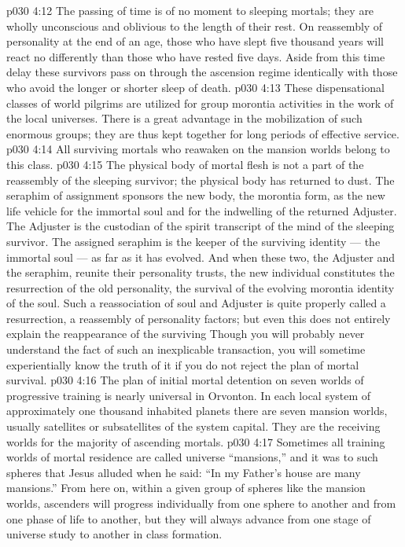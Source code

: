 \vs p030 4:12 The passing of time is of no moment to sleeping mortals; they are wholly unconscious and oblivious to the length of their rest. On reassembly of personality at the end of an age, those who have slept five thousand years will react no differently than those who have rested five days. Aside from this time delay these survivors pass on through the ascension regime identically with those who avoid the longer or shorter sleep of death.
\vs p030 4:13 These dispensational classes of world pilgrims are utilized for group morontia activities in the work of the local universes. There is a great advantage in the mobilization of such enormous groups; they are thus kept together for long periods of effective service.
\vs p030 4:14 \bibnobreakspace {} All surviving mortals who reawaken on the mansion worlds belong to this class.
\vs p030 4:15 The physical body of mortal flesh is not a part of the reassembly of the sleeping survivor; the physical body has returned to dust. The seraphim of assignment sponsors the new body, the morontia form, as the new life vehicle for the immortal soul and for the indwelling of the returned Adjuster. The Adjuster is the custodian of the spirit transcript of the mind of the sleeping survivor. The assigned seraphim is the keeper of the surviving identity --- the immortal soul --- as far as it has evolved. And when these two, the Adjuster and the seraphim, reunite their personality trusts, the new individual constitutes the resurrection of the old personality, the survival of the evolving morontia identity of the soul. Such a reassociation of soul and Adjuster is quite properly called a resurrection, a reassembly of personality factors; but even this does not entirely explain the reappearance of the surviving  Though you will probably never understand the fact of such an inexplicable transaction, you will sometime experientially know the truth of it if you do not reject the plan of mortal survival.
\vs p030 4:16 \pc The plan of initial mortal detention on seven worlds of progressive training is nearly universal in Orvonton. In each local system of approximately one thousand inhabited planets there are seven mansion worlds, usually satellites or subsatellites of the system capital. They are the receiving worlds for the majority of ascending mortals.
\vs p030 4:17 Sometimes all training worlds of mortal residence are called universe “mansions,” and it was to such spheres that Jesus alluded when he said: “In my Father’s house are many mansions.” From here on, within a given group of spheres like the mansion worlds, ascenders will progress individually from one sphere to another and from one phase of life to another, but they will always advance from one stage of universe study to another in class formation.
